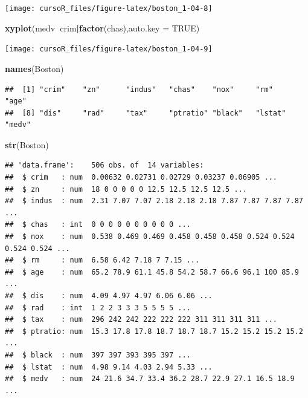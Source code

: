 \documentclass[]{book}
\newenvironment{Shaded}{\begin{snugshade}}{\end{snugshade}}
\newcommand{\KeywordTok}[1]{\textcolor[rgb]{0.13,0.29,0.53}{\textbf{#1}}}
\newcommand{\DataTypeTok}[1]{\textcolor[rgb]{0.13,0.29,0.53}{#1}}
\newcommand{\OtherTok}[1]{\textcolor[rgb]{0.56,0.35,0.01}{#1}}
\newcommand{\OperatorTok}[1]{\textcolor[rgb]{0.81,0.36,0.00}{\textbf{#1}}}
\newcommand{\NormalTok}[1]{#1}
\begin{document}
\begin{center}\texttt{[image: cursoR\_files/figure-latex/boston\_1-04-8]} \end{center}

\begin{Shaded}
\begin{Highlighting}[]
\KeywordTok{xyplot}\NormalTok{(medv}\OperatorTok{~}\NormalTok{crim}\OperatorTok{|}\KeywordTok{factor}\NormalTok{(chas),}\DataTypeTok{auto.key =} \OtherTok{TRUE}\NormalTok{)}
\end{Highlighting}
\end{Shaded}

\begin{center}\texttt{[image: cursoR\_files/figure-latex/boston\_1-04-9]} \end{center}

\begin{Shaded}
\begin{Highlighting}[]
\KeywordTok{names}\NormalTok{(Boston)}
\end{Highlighting}
\end{Shaded}

\begin{verbatim}
##  [1] "crim"    "zn"      "indus"   "chas"    "nox"     "rm"      "age"    
##  [8] "dis"     "rad"     "tax"     "ptratio" "black"   "lstat"   "medv"
\end{verbatim}

\begin{Shaded}
\begin{Highlighting}[]
\KeywordTok{str}\NormalTok{(Boston)}
\end{Highlighting}
\end{Shaded}

\begin{verbatim}
## 'data.frame':    506 obs. of  14 variables:
##  $ crim   : num  0.00632 0.02731 0.02729 0.03237 0.06905 ...
##  $ zn     : num  18 0 0 0 0 0 12.5 12.5 12.5 12.5 ...
##  $ indus  : num  2.31 7.07 7.07 2.18 2.18 2.18 7.87 7.87 7.87 7.87 ...
##  $ chas   : int  0 0 0 0 0 0 0 0 0 0 ...
##  $ nox    : num  0.538 0.469 0.469 0.458 0.458 0.458 0.524 0.524 0.524 0.524 ...
##  $ rm     : num  6.58 6.42 7.18 7 7.15 ...
##  $ age    : num  65.2 78.9 61.1 45.8 54.2 58.7 66.6 96.1 100 85.9 ...
##  $ dis    : num  4.09 4.97 4.97 6.06 6.06 ...
##  $ rad    : int  1 2 2 3 3 3 5 5 5 5 ...
##  $ tax    : num  296 242 242 222 222 222 311 311 311 311 ...
##  $ ptratio: num  15.3 17.8 17.8 18.7 18.7 18.7 15.2 15.2 15.2 15.2 ...
##  $ black  : num  397 397 393 395 397 ...
##  $ lstat  : num  4.98 9.14 4.03 2.94 5.33 ...
##  $ medv   : num  24 21.6 34.7 33.4 36.2 28.7 22.9 27.1 16.5 18.9 ...
\end{verbatim}
\end{document}
